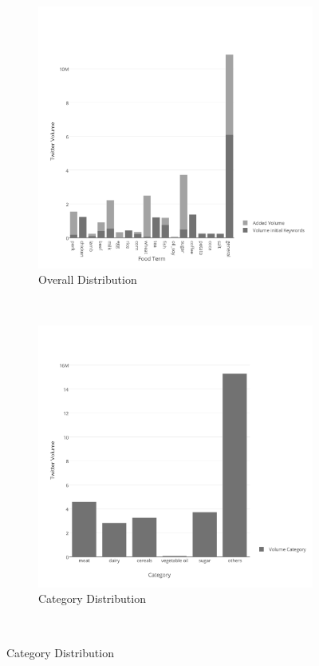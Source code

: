 \begin{figure}[H]
        \centering
        \begin{subfigure}[b]{0.5\textwidth}
                \includegraphics[width=\textwidth]{img/anal/exp_dist_1}
                \caption{Overall Distribution}
                \label{fig:world}
        \end{subfigure}%
        ~ %
        \begin{subfigure}[b]{0.5\textwidth}
                \includegraphics[width=\textwidth]{img/anal/exp_dist_cat_1}
                \caption{Category Distribution}
                \label{fig:cat}
        \end{subfigure}
        ~ %
      

\end{figure}
